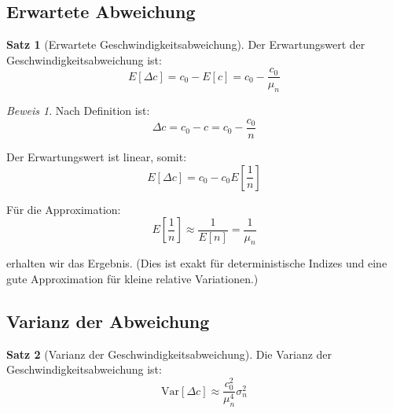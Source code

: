 \documentclass[12pt,a4paper,oneside]{article}
\theoremstyle{definition}
\newtheorem{satz}{Satz}[section]
\theoremstyle{remark}
\newtheorem*{beweis}{Beweis}
\newcommand{\cLight}{c}
\newcommand{\deviation}{\Delta}
\begin{document}
\subsection{Erwartete Abweichung}

\begin{satz}[Erwartete Geschwindigkeitsabweichung]
Der Erwartungswert der Geschwindigkeitsabweichung ist:
\begin{equation}
    E[\deviation \cLight] = \cLight_0 - E[\cLight] = \cLight_0 - \frac{\cLight_0}{\mu_n}
\end{equation}
\end{satz}

\begin{beweis}
Nach Definition ist:
\begin{equation}
    \deviation \cLight = \cLight_0 - \cLight = \cLight_0 - \frac{\cLight_0}{n}
\end{equation}

Der Erwartungswert ist linear, somit:
\begin{equation}
    E[\deviation \cLight] = \cLight_0 - \cLight_0 E\left[\frac{1}{n}\right]
\end{equation}

Für die Approximation:
\begin{equation}
    E\left[\frac{1}{n}\right] \approx \frac{1}{E[n]} = \frac{1}{\mu_n}
\end{equation}

erhalten wir das Ergebnis. (Dies ist exakt für deterministische Indizes und eine gute Approximation für kleine relative Variationen.)
\end{beweis}

\subsection{Varianz der Abweichung}

\begin{satz}[Varianz der Geschwindigkeitsabweichung]
Die Varianz der Geschwindigkeitsabweichung ist:
\begin{equation}
    \text{Var}[\deviation \cLight] \approx \frac{\cLight_0^2}{\mu_n^4} \sigma_n^2
\end{equation}
\end{satz}
\end{document}
